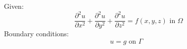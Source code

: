 \documentclass{article}
\title{}
\author{}
\date{\today}
\begin{document}
Given: 
\[
	\frac{\partial^2 u}{\partial x^2} + \frac{\partial^2 u}{\partial y^2} +\frac{\partial^2 u}{\partial z^2} = f(x,y,z) \text{ in $\Omega$}
\] 
Boundary conditions:  
\[
	u = g \text{ on $\Gamma$ }
\] 
\end{document}
